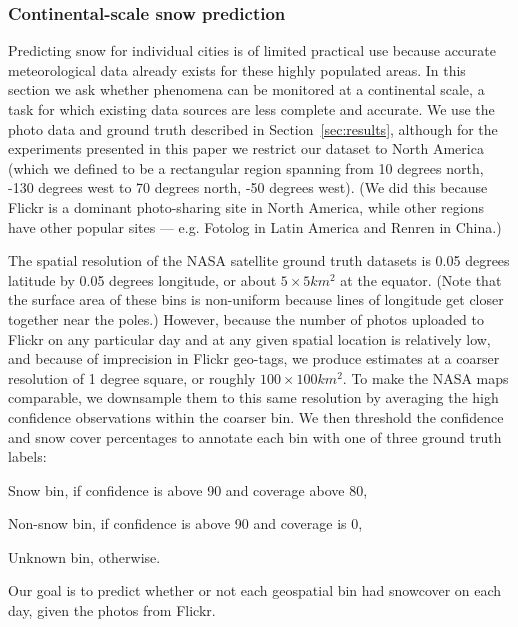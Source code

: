 


%


\subsubsection*{Continental-scale snow prediction}
Predicting snow  for individual cities is of limited practical use
because accurate meteorological data already exists for these highly
populated areas. In this section we ask whether phenomena can be
monitored at a continental scale, a task for which existing data
sources are less complete and accurate.  We use the photo data and
ground truth described in Section~\ref{sec:results}, although for the
experiments presented in this paper we restrict our dataset to North
America (which we defined to be a rectangular region spanning from 10
degrees north, -130 degrees west to 70 degrees north, -50 degrees
west). (We did this because Flickr is a dominant photo-sharing site in
North America, while other regions have other popular
sites --- e.g. Fotolog in Latin America and Renren in China.)  

The spatial resolution of the NASA satellite ground truth datasets is 0.05 degrees
latitude by 0.05 degrees longitude, or about $5 \times 5 km^2$ at the
equator.  (Note that the surface area of these bins is
non-uniform because lines of longitude get closer together near the
poles.)  However, because the number of photos uploaded to Flickr on
any particular day and at any given spatial location is relatively
low, and because of imprecision in Flickr geo-tags, we produce
estimates at a coarser resolution of 1 degree square, or roughly $100
\times 100 km^2$. To make the NASA maps comparable, we downsample them
to this same resolution by averaging the high confidence observations within the coarser bin.
We then threshold the confidence and snow cover percentages to annotate
each bin with one of three ground truth labels: 
%
\begin{packed_itemize}
\item[---] Snow bin, if confidence is above 90 and coverage above 80,
\item[---] Non-snow bin, if confidence is above 90 and coverage is 0,
\item[---] Unknown bin, otherwise.
\end{packed_itemize}
%
Our goal is to predict whether or not each geospatial bin had snowcover on each day,
given the photos from Flickr.

